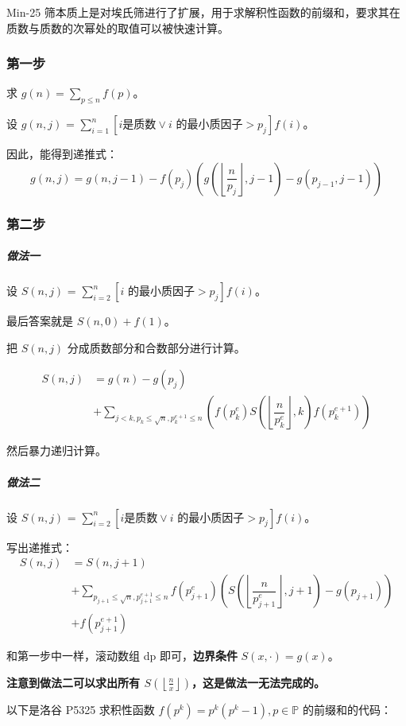 Min-25 筛本质上是对埃氏筛进行了扩展，用于求解积性函数的前缀和，要求其在质数与质数的次幂处的取值可以被快速计算。


\subsubsection*{第一步}

求 $g(n) = \sum_{p\le n} f(p)$。


设 $g(n, j)$ = $\sum_{i=1}^n [i\text{是质数}\vee i\text{ 的最小质因子}>p_j]f(i)$。


因此，能得到递推式：
$$
g(n,j) = g(n, j-1) - f(p_j)\left(g\left(\left \lfloor  \dfrac{n}{p_j}\right \rfloor, j-1 \right) - g\left(p_{j-1}, j-1\right)\right)
$$

\subsubsection*{第二步}
\subparagraph*{做法一}


设 $S(n, j)$ = $\sum_{i=2}^n [i\text{ 的最小质因子}>p_j]f(i)$。

最后答案就是 $S(n,0) + f(1)$。

把 $S(n,j)$ 分成质数部分和合数部分进行计算。

$$
\begin{aligned}
S(n,j) &= g(n) - g(p_j) \\
 &+\sum_{j<k,p_k\le\sqrt n,p_k^{e+1}\le n }\left( f(p_k^e) S\left ( \left \lfloor \dfrac{n}{p_k^e} \right \rfloor,k  \right )  f(p_k^{e+1})\right)
\end{aligned}
$$


然后暴力递归计算。


\subparagraph*{做法二}


设 $S(n, j)$ = $\sum_{i=2}^n [i\text{是质数}\vee i\text{ 的最小质因子}>p_j]f(i)$。


写出递推式：
$$
\begin{aligned}
S(n,j) &= S(n,j+1)\\
&+\sum_{p_{j+1}\le\sqrt n,p_{j+1}^{e+1}\le n}f(p_{j+1}^e)\left(S\left ( \left \lfloor \dfrac{n}{p_{j+1}^e} \right \rfloor ,j+1 \right ) -g(p_{j+1})\right)\\
&+ f(p_{j+1}^{e+1})
\end{aligned}
$$

和第一步中一样，滚动数组 dp 即可，\textbf{边界条件} $S(x,\cdot)=g(x)$。


\textbf{注意到做法二可以求出所有 $S(\left\lfloor\frac n x\right\rfloor)$，这是做法一无法完成的。}



以下是洛谷 P5325 求积性函数 $f(p^k)=p^k(p^k-1),p\in\mathbb P$ 的前缀和的代码：
\inputminted{cpp}{src/number theory/min25.cpp}